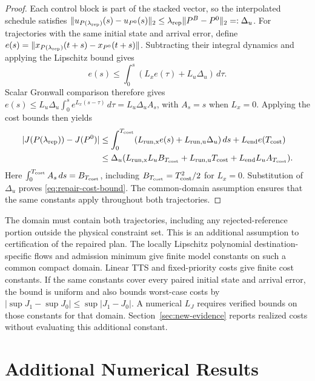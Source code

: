 \documentclass[preprint,12pt]{elsarticle}
\theoremstyle{definition}
\theoremstyle{plain}
\theoremstyle{definition}
\theoremstyle{plain}
\begin{document}
\begin{proof}
Each control block is part of the stacked vector, so the interpolated
schedule satisfies
$\|u_{P(\lambda_{\rm rep})}(s)-u_{P^0}(s)\|_2\le
\lambda_{\rm rep}\|P^B-P^0\|_2=:\Delta_u$.
For trajectories with the same initial state and arrival error, define
$e(s)=\|x_{P(\lambda_{\rm rep})}(t+s)-x_{P^0}(t+s)\|$.
Subtracting their integral dynamics and applying the Lipschitz bound gives
\[
 e(s)\le\int_0^s(L_xe(\tau)+L_u\Delta_u)\,d\tau.
\]
Scalar Gronwall comparison therefore gives
$e(s)\le L_u\Delta_u\int_0^s e^{L_x(s-\tau)}\,d\tau=L_u\Delta_u A_s$,
with $A_s=s$ when $L_x=0$. Applying the cost bounds then yields
\[
\begin{aligned}
 |J(P(\lambda_{\rm rep}))-J(P^0)|
 &\le\int_0^{T_{\rm cost}}(L_{\rm run,x}e(s)+L_{\rm run,u}\Delta_u)\,ds+L_{\rm end}e(T_{\rm cost})\\
 &\le\Delta_u(L_{\rm run,x}L_uB_{T_{\rm cost}}+L_{\rm run,u}T_{\rm cost}+L_{\rm end}L_uA_{T_{\rm cost}}).
\end{aligned}
\]
Here $\int_0^{T_{\rm cost}} A_s\,ds=B_{T_{\rm cost}}$, including $B_{T_{\rm cost}}=T_{\rm cost}^2/2$ for $L_x=0$.
Substitution of $\Delta_u$ proves \eqref{eq:repair-cost-bound}.
The common-domain assumption ensures that the same constants apply
throughout both trajectories.
\end{proof}

The domain must contain both trajectories, including any rejected-reference
portion outside the physical constraint set. This is an additional
assumption to certification of the repaired plan. The locally Lipschitz
polynomial destination-specific flows and admission minimum give finite model constants
on such a common compact domain. Linear TTS and fixed-priority costs give
finite cost constants. If the same constants cover every paired initial
state and arrival error, the bound is uniform and also bounds worst-case costs
by $|\sup J_1-\sup J_0|\le\sup|J_1-J_0|$. A numerical $L_J$ requires
verified bounds on those constants for that domain. Section~\ref{sec:new-evidence} reports realized costs without
evaluating this additional constant.

\section{Additional Numerical Results}
\label{app:additional-numerics}
\end{document}
